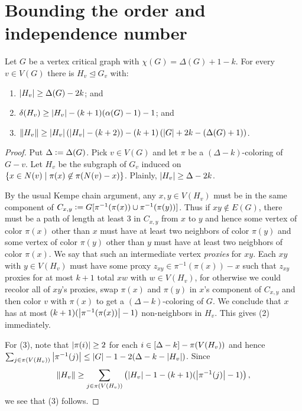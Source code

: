 \section{Bounding the order and independence number}
\begin{lem}\label{Onesies}
Let $G$ be a vertex critical graph with $\chi(G) = \Delta(G) + 1 - k$.  For every $v \in V(G)$ there is $H_v \unlhd G_v$ with:
\begin{enumerate}
\item $\left|H_v\right| \geq \Delta(G) - 2k$; and
\item $\delta(H_v) \geq \left|H_v\right| - (k+1)(\alpha(G) - 1) - 1$; and
\item $\left\Vert H_v\right\Vert \geq \left|H_v\right|\left( \left|H_v\right|- (k+2) \right) - (k+1)\left( \left|G\right| + 2k - (\Delta(G) + 1) \right)$.
\end{enumerate}
\end{lem}
\begin{proof}
Put $\Delta \mathrel{\mathop:}= \Delta(G)$. Pick $v \in V(G)$ and let $\pi$ be a $(\Delta - k)$-coloring of $G-v$.  Let $H_v$ be the subgraph of $G_v$ induced on $\left\{ x \in N(v) \mid \pi(x) \not \in \pi(N(v) - x) \right\}$.  Plainly, $\left|H_v\right| \geq \Delta - 2k$.

By the usual Kempe chain argument, any $x, y \in V(H_v)$ must be in the same component of $C_{x,y} \mathrel{\mathop:}= G[\pi^{-1}(\pi(x)) \cup \pi^{-1}(\pi(y))]$.  Thus if $xy \not \in E(G)$, there must be a path of length at least $3$ in $C_{x,y}$ from $x$ to $y$ and hence some vertex of color $\pi(x)$ other than $x$ must have at least two neighbors of color $\pi(y)$ and some vertex of color $\pi(y)$ other than $y$ must have at least two neigbhors of color $\pi(x)$.  We say that such an intermediate vertex \emph{proxies} for $xy$.  Each $xy$ with $y \in V(H_v)$ must have some proxy $z_{xy} \in \pi^{-1}(\pi(x)) - x$ such that $z_{xy}$ proxies for at most $k+1$ total $xw$ with $w \in V(H_v)$, for otherwise we could recolor all of $xy$'s proxies, swap $\pi(x)$ and $\pi(y)$ in $x$'s component of $C_{x,y}$ and then color $v$ with $\pi(x)$ to get a $(\Delta-k)$-coloring of $G$.  We conclude that $x$ has at most $(k+1)(\left|\pi^{-1}(\pi(x))\right| - 1)$ non-neighbors in $H_v$.  This gives (2) immediately.

For (3), note that $\left|\pi(i)\right| \geq 2$ for each $i \in \left[\Delta-k\right] - \pi(V(H_v))$ and hence $\sum_{j \in \pi(V(H_v))} \left|\pi^{-1}(j)\right| \leq \left|G\right| - 1 - 2(\Delta - k - \left|H_v\right|)$.  Since 
\[\left\Vert H_v\right\Vert \geq \sum_{j  \in \pi(V(H_v))} \left( \left|H_v\right| - 1 - (k+1)(\left|\pi^{-1}(j)\right| - 1) \right),\] 
\noindent we see that (3) follows.
\end{proof}

